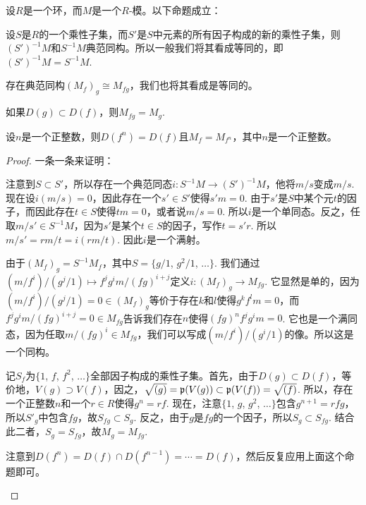 \begin{lem}
设$R$是一个环，而$M$是一个$R$-模。以下命题成立：
\begin{compactenum}[~~~1.]
\item 设$S$是$R$的一个乘性子集，而$S'$是$S$中元素的所有因子构成的新的乘性子集，则$(S')^{-1}M$和$S^{-1}M$典范同构。所以一般我们将其看成等同的，即$(S')^{-1}M=S^{-1}M$. 
\item 存在典范同构$(M_f)_g\cong M_{fg}$，我们也将其看成是等同的。
\item 如果$D(g)\subset D(f)$，则$M_{fg}=M_{g}$.
\item 设$n$是一个正整数，则$D(f^n)=D(f)$且$M_{f}=M_{f^n}$，其中$n$是一个正整数。
\end{compactenum}
\end{lem}

\begin{proof}
一条一条来证明：
\begin{compactenum}[~~~1.]
\item 注意到$S\subset S'$，所以存在一个典范同态$i:S^{-1}M\to (S')^{-1}M$，他将$m/s$变成$m/s$. 现在设$i(m/s)=0$，因此存在一个$s'\in S'$使得$s'm=0$. 由于$s'$是$S$中某个元$t$的因子，而因此存在$t\in S$使得$tm=0$，或者说$m/s=0$. 所以$i$是一个单同态。反之，任取$m/s'\in S^{-1}M$，因为$s'$是某个$t\in S$的因子，写作$t=s'r$. 所以$m/s'=rm/t=i(rm/t)$. 因此$i$是一个满射。

\item 由于$(M_f)_g=S^{-1}M_f$，其中$S=\{g/1$, $g^2/1$, $\dots\}$. 我们通过$(m/f^i)/(g^j/1)\mapsto f^j g^i m/(fg)^{i+j}$定义$i:(M_f)_g\to M_{fg}$. 它显然是单的，因为$(m/f^i)/(g^j/1)=0\in (M_f)_g$等价于存在$k$和$l$使得$g^kf^l m=0$，而$f^j g^i m/(fg)^{i+j}=0\in M_{fg}$告诉我们存在$n$使得$(fg)^nf^j g^i m=0$. 它也是一个满同态，因为任取$m/(fg)^i\in M_{fg}$，我们可以写成$(m/f^i)/(g^i/1)$的像。所以这是一个同构。

\item 记$S_f$为$\{1$, $f$, $f^{2}$, $\dots\}$全部因子构成的乘性子集。首先，由于$D(g)\subset D(f)$，等价地，$V(g)\supset V(f)$，因之，$\sqrt{(g)}=\mathfrak{p}(V(g))\subset \mathfrak{p}(V(f))=\sqrt{(f)}$. 所以，存在
一个正整数$n$和一个$r\in R$使得$g^n=rf$. 现在，注意$\{1$, $g$, $g^{2}$, $\dots\}$包含$g^{n+1}=rfg$，所以$S'_g$中包含$fg$，故$S_{fg}\subset S_g$. 反之，由于$g$是$fg$的一个因子，所以$S_g\subset S_{fg}$. 结合此二者，$S_g=S_{fg}$，故$M_g=M_{fg}$.

\item 注意到$D(f^n)=D(f)\cap D(f^{n-1})=\cdots=D(f)$，然后反复应用上面这个命题即可。\qedhere
\end{compactenum}
\end{proof}

